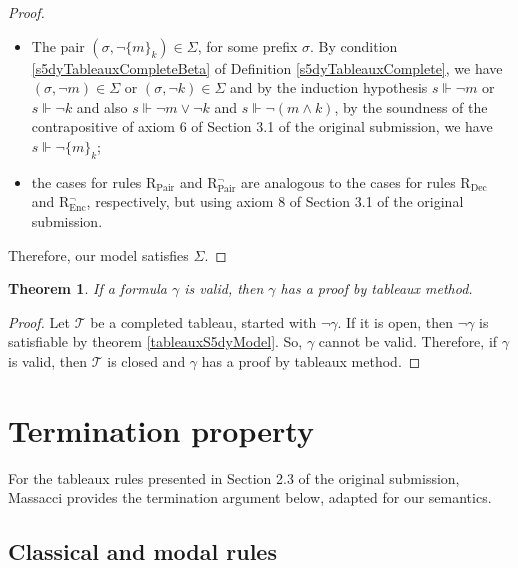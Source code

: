 \documentclass[submission,copyright,creativecommons]{eptcs}
\newtheorem{theorem}[definition]{Theorem}
\begin{document}
\begin{proof}
\begin{itemize}
                \item The pair $(\sigma, \neg \{m\}_k) \in \Sigma$, for some prefix $\sigma$.  By condition \ref{s5dyTableauxCompleteBeta} of Definition \ref{s5dyTableauxComplete}, we have $(\sigma, \neg m) \in \Sigma$ or $(\sigma, \neg k) \in \Sigma$ and by the induction hypothesis $s \Vdash \neg m$ or $s \Vdash \neg k$ and also $s \Vdash \neg m \lor \neg k$ and $s \Vdash \neg (m \land  k)$, by the soundness of the contrapositive of axiom 6 of Section 3.1 of the original submission, we have $s \Vdash \neg \{m\}_k$;
            
                \item the cases for rules R$_\text{Pair}$ and R$_\text{Pair}^\neg$ are analogous to the cases for rules R$_\text{Dec}$ and R$_\text{Enc}^\neg$, respectively, but using axiom 8 of Section 3.1 of the original submission.
            \end{itemize}
        
            Therefore, our model satisfies $\Sigma$.
        \end{proof}
        
        \begin{theorem}
            If a formula $\gamma$ is valid, then $\gamma$ has a proof by tableaux method.
        \end{theorem}
        
        \begin{proof}
            Let $\mathscr{T}$ be a completed tableau, started with $\neg \gamma$. If it is open, then $\neg \gamma$ is satisfiable by theorem \ref{tableauxS5dyModel}. So, $\gamma$ cannot be valid. Therefore, if $\gamma$ is valid, then $\mathscr{T}$ is closed and $\gamma$ has a proof by tableaux method.
        \end{proof}
        
        
        
    \section{Termination property}
        \label{sec:dymaelTableauxTermination}
        
        For the tableaux rules presented in Section 2.3 of the original submission, Massacci \cite{massacci2000singlesteptableaux} provides the termination argument below, adapted for our semantics.
        
        \subsection{Classical and modal rules}
            \label{subsec:dymaelTableauxTerminationClassicModalRules}
        
\end{document}
